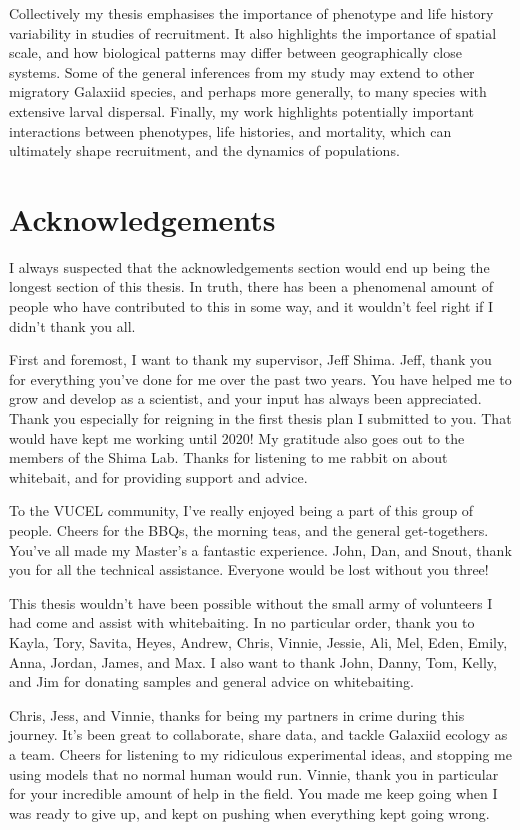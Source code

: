 \documentclass[]{book}
\begin{document}
Collectively my thesis emphasises the importance of phenotype and life
history variability in studies of recruitment. It also highlights the
importance of spatial scale, and how biological patterns may differ
between geographically close systems. Some of the general inferences
from my study may extend to other migratory Galaxiid species, and
perhaps more generally, to many species with extensive larval dispersal.
Finally, my work highlights potentially important interactions between
phenotypes, life histories, and mortality, which can ultimately shape
recruitment, and the dynamics of populations.

\section*{Acknowledgements}\label{acknowledgements}

I always suspected that the acknowledgements section would end up being
the longest section of this thesis. In truth, there has been a
phenomenal amount of people who have contributed to this in some way,
and it wouldn't feel right if I didn't thank you all.

First and foremost, I want to thank my supervisor, Jeff Shima. Jeff,
thank you for everything you've done for me over the past two years. You
have helped me to grow and develop as a scientist, and your input has
always been appreciated. Thank you especially for reigning in the first
thesis plan I submitted to you. That would have kept me working until
2020! My gratitude also goes out to the members of the Shima Lab. Thanks
for listening to me rabbit on about whitebait, and for providing support
and advice.

To the VUCEL community, I've really enjoyed being a part of this group
of people. Cheers for the BBQs, the morning teas, and the general
get-togethers. You've all made my Master's a fantastic experience. John,
Dan, and Snout, thank you for all the technical assistance. Everyone
would be lost without you three!

This thesis wouldn't have been possible without the small army of
volunteers I had come and assist with whitebaiting. In no particular
order, thank you to Kayla, Tory, Savita, Heyes, Andrew, Chris, Vinnie,
Jessie, Ali, Mel, Eden, Emily, Anna, Jordan, James, and Max. I also want
to thank John, Danny, Tom, Kelly, and Jim for donating samples and
general advice on whitebaiting.

Chris, Jess, and Vinnie, thanks for being my partners in crime during
this journey. It's been great to collaborate, share data, and tackle
Galaxiid ecology as a team. Cheers for listening to my ridiculous
experimental ideas, and stopping me using models that no normal human
would run. Vinnie, thank you in particular for your incredible amount of
help in the field. You made me keep going when I was ready to give up,
and kept on pushing when everything kept going wrong.
\end{document}
